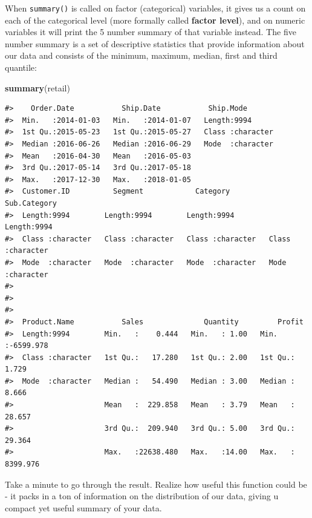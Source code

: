 \documentclass[]{article}
\newenvironment{Shaded}{\begin{snugshade}}{\end{snugshade}}
\newcommand{\KeywordTok}[1]{\textcolor[rgb]{0.13,0.29,0.53}{\textbf{#1}}}
\newcommand{\NormalTok}[1]{#1}
\begin{document}
When \texttt{summary()} is called on factor (categorical) variables, it
gives us a count on each of the categorical level (more formally called
\textbf{factor level}), and on numeric variables it will print the 5
number summary of that variable instead. The five number summary is a
set of descriptive statistics that provide information about our data
and consists of the minimum, maximum, median, first and third quantile:

\begin{Shaded}
\begin{Highlighting}[]
\KeywordTok{summary}\NormalTok{(retail)}
\end{Highlighting}
\end{Shaded}

\begin{verbatim}
#>    Order.Date           Ship.Date           Ship.Mode        
#>  Min.   :2014-01-03   Min.   :2014-01-07   Length:9994       
#>  1st Qu.:2015-05-23   1st Qu.:2015-05-27   Class :character  
#>  Median :2016-06-26   Median :2016-06-29   Mode  :character  
#>  Mean   :2016-04-30   Mean   :2016-05-03                     
#>  3rd Qu.:2017-05-14   3rd Qu.:2017-05-18                     
#>  Max.   :2017-12-30   Max.   :2018-01-05                     
#>  Customer.ID          Segment            Category         Sub.Category      
#>  Length:9994        Length:9994        Length:9994        Length:9994       
#>  Class :character   Class :character   Class :character   Class :character  
#>  Mode  :character   Mode  :character   Mode  :character   Mode  :character  
#>                                                                             
#>                                                                             
#>                                                                             
#>  Product.Name           Sales              Quantity         Profit         
#>  Length:9994        Min.   :    0.444   Min.   : 1.00   Min.   :-6599.978  
#>  Class :character   1st Qu.:   17.280   1st Qu.: 2.00   1st Qu.:    1.729  
#>  Mode  :character   Median :   54.490   Median : 3.00   Median :    8.666  
#>                     Mean   :  229.858   Mean   : 3.79   Mean   :   28.657  
#>                     3rd Qu.:  209.940   3rd Qu.: 5.00   3rd Qu.:   29.364  
#>                     Max.   :22638.480   Max.   :14.00   Max.   : 8399.976
\end{verbatim}

Take a minute to go through the result. Realize how useful this function
could be - it packs in a ton of information on the distribution of our
data, giving u compact yet useful summary of your data.
\end{document}
